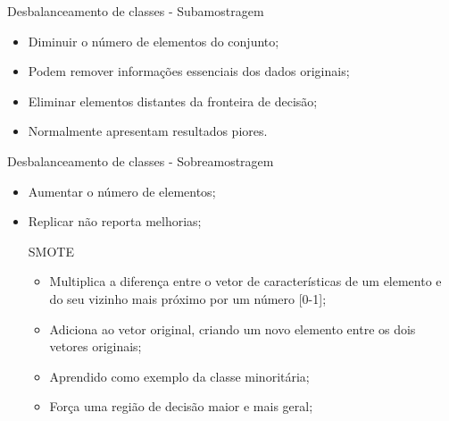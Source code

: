 \documentclass{beamer}
\begin{document}
\begin{frame}{Desbalanceamento de classes - Subamostragem}
\setlength\leftmargini{0em}
\justifying
    \begin{itemize}
        \item Diminuir o número de elementos do conjunto;
        \item Podem remover informações essenciais dos dados originais;
        \item Eliminar elementos distantes da fronteira de decisão;
        \item Normalmente apresentam resultados piores.
    \end{itemize}
\end{frame}
\begin{frame}{Desbalanceamento de classes - Sobreamostragem}
\setlength\leftmargini{0em}
\justifying
    \begin{itemize}
        \item Aumentar o número de elementos;
        \item Replicar não reporta melhorias;
    \begin{block}{SMOTE}
\setlength\leftmargini{1em}
        \begin{itemize}
            \item Multiplica a diferença entre o vetor de características de um elemento e do seu vizinho mais próximo por um número [0-1];
            \item Adiciona ao vetor original, criando um novo elemento entre os dois vetores originais;
            \item Aprendido como exemplo da classe minoritária;
            \item Força uma região de decisão maior e mais geral;
        \end{itemize}
    \end{block}
    \end{itemize}
\end{frame}
\end{document}
